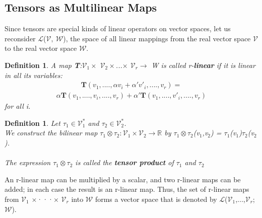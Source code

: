 \documentclass[12pt,a4paper]{article}
\newtheorem{defn}[thm]{Definition}
\begin{document}
\subsection{Tensors as Multilinear Maps}
Since tensors are special kinds of linear operators on vector spaces, let us reconsider $\mathcal{L}$($\mathcal{V},\ \mathcal{W}$), the space of all linear mappings from the real vector space $\mathcal{V}$ to the real vector space $\mathcal{W}$. 
\begin{defn}
A map \textbf{T}:$\mathcal{V}$$_1\times$ $\mathcal{V}$$_2\times $...$\times$ $\mathcal{V}$$_r\to$ W is called r-\textbf{linear} if it is linear in all its variables:
\begin{align*}
\textbf{T}(v_1,....,\alpha v_i + \alpha'v'_i,....,v_r) =  
\end{align*}
\begin{align*}
\alpha\textbf{T}(v_1,....,v_i,....,v_r) + \alpha'\textbf{T}(v_1,....,v'_i,....,v_r)
\end{align*}
for all i.
\end{defn}
\begin{defn}
Let $\tau_1\in \mathcal{V}^*_1$ and $\tau_2\in \mathcal{V}^*_2$. \\
We construct the bilinear map $\tau_1\otimes \tau_2:\mathcal{V}_1\times \mathcal{V}_2\to \mathbb{R}$ by $\tau_1\otimes \tau_2$(v$_1$,v$_2$) = $\tau_1$(v$_1$)$\tau_2$(v$_2$). \\\\The expression $\tau_1\otimes \tau_2$ is called the \textbf{tensor product} of $\tau_1$ and $\tau_2$
\end{defn}
An r-linear map can be multiplied by a scalar, and two r-linear maps can
be added; in each case the result is an r-linear map. Thus, the set of r-linear
maps from $\mathcal{V}$$_1$ $\times$···$\times$ $\mathcal{V}$$_r$ into $\mathcal{W}$ forms a vector space that is denoted by
$\mathcal{L}$($\mathcal{V}$$_1$,...,$\mathcal{V}$$_r$;$\mathcal{W}$).\\
\end{document}
